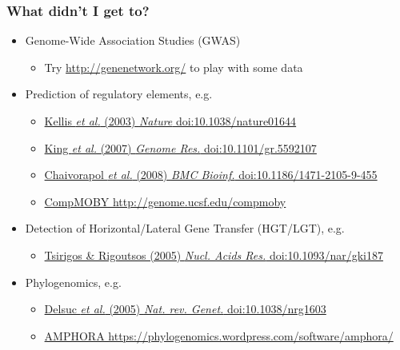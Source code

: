 %
\begin{frame}
  \frametitle{What didn't I get to?}
  \begin{itemize}
    \item   \textcolor{hutton_green}{Genome-Wide Association Studies (GWAS)}
    \begin{itemize}
      \item   Try \href{http://genenetwork.org/}{http://genenetwork.org/} to play with some data
    \end{itemize}
    \item Prediction of regulatory elements, e.g.
    \begin{itemize}
      \item {\tiny\href{http://dx.doi.org/10.1038/nature01644}
                              {Kellis \textit{et al.} (2003) \textit{Nature} doi:10.1038/nature01644}}
      \item {\tiny\href{http://dx.doi.org/10.1101/gr.5592107}
                              {King \textit{et al.} (2007) \textit{Genome Res.} doi:10.1101/gr.5592107}}
      \item {\tiny\href{http://dx.doi.org/10.1186/1471-2105-9-455}
                              {Chaivorapol \textit{et al.} (2008) \textit{BMC Bioinf.} doi:10.1186/1471-2105-9-455}}
      \item {\tiny\href{http://genome.ucsf.edu/compmoby}
                              {CompMOBY http://genome.ucsf.edu/compmoby}}
    \end{itemize}
    \item   \textcolor{hutton_purple}{Detection of Horizontal/Lateral Gene Transfer (HGT/LGT), e.g.}
    \begin{itemize}
      \item {\tiny\href{http://dx.doi.org/10.1093/nar/gki187}
                              {Tsirigos \& Rigoutsos (2005) \textit{Nucl. Acids Res.} doi:10.1093/nar/gki187}}
    \end{itemize}
    \item   \textcolor{RawSienna}{Phylogenomics, e.g.}
    \begin{itemize}
      \item {\tiny\href{http://dx.doi.org/10.1038/nrg1603}
                              {Delsuc \textit{et al.} (2005) \textit{Nat. rev. Genet.} doi:10.1038/nrg1603}}
      \item {\tiny\href{https://phylogenomics.wordpress.com/software/amphora/}
                              {AMPHORA https://phylogenomics.wordpress.com/software/amphora/}}
    \end{itemize}
  \end{itemize}
\end{frame}

